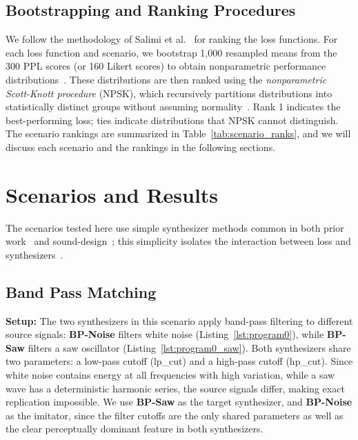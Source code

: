 \documentclass{article}
\newcommand{\anon}[1]{{#1}}
\newcommand{\BPNoise}{\textbf{BP-Noise}\xspace}
\newcommand{\BPSaw}{\textbf{BP-Saw}\xspace}
\begin{document}
\subsection{Bootstrapping and Ranking Procedures}
\label{sec:bootstrapping_ranking}
We follow the methodology of \anon{Salimi et al.}~\cite{salimi2025evaluating} for ranking the loss functions. For each loss function and scenario, we bootstrap 1,000 resampled means from the 300 PPL scores (or 160 Likert scores) to obtain nonparametric performance distributions~\cite{chernick2011bootstrap}. These distributions are then ranked using the \textit{nonparametric Scott-Knott procedure} (NPSK), which recursively partitions distributions into statistically distinct groups without assuming normality~\cite{tantithamthavorn2017mvt,tantithamthavorn2018optimization}. Rank 1 indicates the best-performing loss; ties indicate distributions that NPSK cannot distinguish. The scenario rankings are summarized in Table~\ref{tab:scenario_ranks}, and we will discuss each scenario and the rankings in the following sections.




\section{Scenarios and Results}
\label{sec:scenarios}
The scenarios tested here use simple synthesizer methods common in 
both prior work~\cite{engel2020ddsp,vahidi2023mesostructures} and sound-design~\cite{roads1996computer,
lyons1997understanding}; this simplicity isolates the interaction between loss and synthesizers~\cite{salimi2025evaluating}. 


\subsection{Band Pass Matching }
\label{sec:scenario_bp_saw_noise}

\textbf{Setup:} The two synthesizers in this scenario apply band-pass filtering to different source signals: \BPNoise filters white noise (Listing~\ref{lst:program0}), while \BPSaw filters a saw oscillator (Listing~\ref{lst:program0_saw}). Both synthesizers share two parameters: a low-pass cutoff (lp\_cut) and a high-pass cutoff (hp\_cut). Since white noise contains energy at all frequencies with high variation, while a saw wave has a deterministic harmonic series, the source signals differ, making exact replication impossible. We use \BPSaw as the target synthesizer, and \BPNoise as the imitator, since the filter cutoffs are the only shared parameters as well as the clear perceptually dominant feature in both synthesizers. 
 
\end{document}
